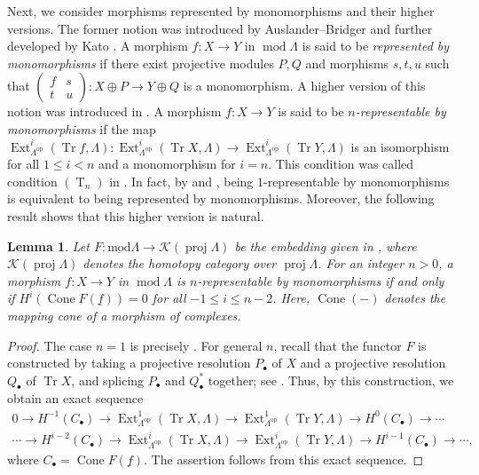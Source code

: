 \documentclass{amsart}
\newtheorem{lem}[thm]{Lemma}
\theoremstyle{definition}
\theoremstyle{remark}
\numberwithin{equation}{thm}
\def\Cone{\operatorname{Cone}}
\def\Ext{\operatorname{Ext}}
\def\K{\mathcal{K}}
\def\le{\leqslant}
\def\lmod{\operatorname{\underline{mod}}}
\def\mod{\operatorname{mod}}
\def\proj{\operatorname{proj}}
\def\t{\mathrm{T}}
\def\tr{\operatorname{Tr}}
\begin{document}
Next, we consider morphisms represented by monomorphisms and their higher versions. The former notion was introduced by Auslander--Bridger \cite{AB} and further developed by Kato \cite{Kmorp}. A morphism $f:X\to Y$ in $\mod\Lambda$ is said to be {\em represented by monomorphisms} if there exist projective modules $P,Q$ and morphisms $s,t,u$ such that $\begin{pmatrix}f&s\\t&u\end{pmatrix}:X\oplus P\to Y\oplus Q$ is a monomorphism. A higher version of this notion was introduced in \cite{Omorp}. A morphism $f:X\to Y$ is said to be {\em $n$-representable by monomorphisms} if the map $\Ext^i_{\Lambda^{\mathrm{op}}}(\tr f,\Lambda):\Ext^i_{\Lambda^{\mathrm{op}}}(\tr X,\Lambda)\to\Ext^i_{\Lambda^{\mathrm{op}}}(\tr Y,\Lambda)$ is an isomorphism for all $1\le i<n$ and a monomorphism for $i=n$. This condition was called condition $(\operatorname{T}_n)$ in \cite[Definition 3.1]{Omorp}. In fact, by \cite[Proposition 3.6 and Theorem 3.9]{Kmorp} and \cite[Theorem 3.8]{Omorp}, being $1$-representable by monomorphisms is equivalent to being represented by monomorphisms. Moreover, the following result shows that this higher version is natural.

\begin{lem}\label{embedd}
Let $F:\lmod\Lambda\to\K(\proj\Lambda)$ be the embedding given in \cite{Kkern}, where $\K(\proj\Lambda)$ denotes the homotopy category over $\proj\Lambda$. For an integer $n>0$, a morphism $f:X\to Y$ in $\mod\Lambda$ is $n$-representable by monomorphisms if and only if $H^i(\Cone F(\underline{f}))=0$ for all $-1\le i\le n-2$. Here, $\Cone(-)$ denotes the mapping cone of a morphism of complexes.
\end{lem}

\begin{proof}
The case $n=1$ is precisely \cite[Theorem 3.9]{Kmorp}. For general $n$, recall that the functor $F$ is constructed by taking a projective resolution $P_\bullet$ of $X$ and a projective resolution $Q_\bullet$ of $\tr X$, and splicing $P_\bullet$ and $Q_\bullet^\ast$ together; see \cite[Proposition 2.3]{Kkern}. Thus, by this construction, we obtain an exact sequence
\begin{align*}
0\to H^{-1}(C_\bullet)\to\Ext^1_{\Lambda^{\mathrm{op}}}(\tr X,\Lambda)\to\Ext^1_{\Lambda^{\mathrm{op}}}(\tr Y,\Lambda)\to H^0(C_\bullet)\to\cdots\\
\cdots\to H^{i-2}(C_\bullet)\to\Ext^i_{\Lambda^{\mathrm{op}}}(\tr X,\Lambda)\to\Ext^i_{\Lambda^{\mathrm{op}}}(\tr Y,\Lambda)\to H^{i-1}(C_\bullet)\to\cdots,
\end{align*}
where $C_\bullet=\Cone F(\underline{f})$. The assertion follows from this exact sequence.
\end{proof}
\end{document}
